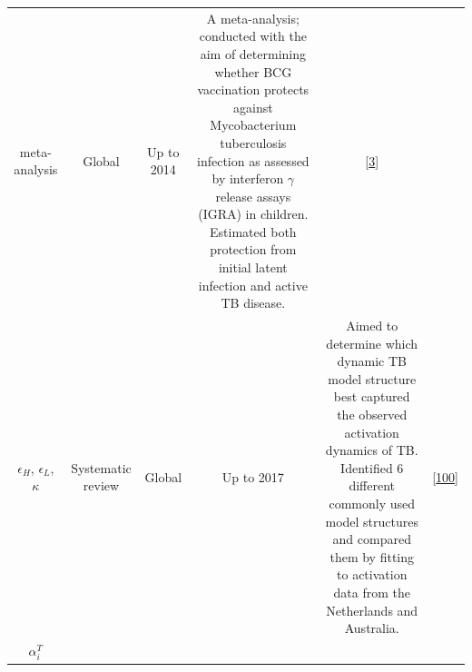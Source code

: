\documentclass[11pt,twoside]{bristolthesis}
\begin{document}
\begin{longtable}[]{@{}cccccc@{}}
\begin{minipage}[t]{0.10\columnwidth}
  meta-analysis\strut
  \end{minipage} & \begin{minipage}[t]{0.07\columnwidth}\centering
  Global\strut
  \end{minipage} & \begin{minipage}[t]{0.07\columnwidth}\centering
  Up to
  2014\strut
  \end{minipage} & \begin{minipage}[t]{0.27\columnwidth}\centering
  A meta-analysis; conducted with the aim
  of determining whether BCG vaccination
  protects against Mycobacterium
  tuberculosis infection as assessed by
  interferon \(\gamma\) release assays
  (IGRA) in children. Estimated both
  protection from initial latent infection
  and active TB disease.\strut
  \end{minipage} & \begin{minipage}[t]{0.11\columnwidth}\centering
  {[}\protect\hyperlink{ref-Roy2014}{3}{]}\strut
  \end{minipage}\tabularnewline
  \begin{minipage}[t]{0.21\columnwidth}\centering
  \(\epsilon_H\),
  \(\epsilon_L\),
  \(\kappa\)\strut
  \end{minipage} & \begin{minipage}[t]{0.10\columnwidth}\centering
  Systematic
  review\strut
  \end{minipage} & \begin{minipage}[t]{0.07\columnwidth}\centering
  Global\strut
  \end{minipage} & \begin{minipage}[t]{0.07\columnwidth}\centering
  Up to
  2017\strut
  \end{minipage} & \begin{minipage}[t]{0.27\columnwidth}\centering
  Aimed to determine which dynamic TB
  model structure best captured the
  observed activation dynamics of TB.
  Identified 6 different commonly used
  model structures and compared them by
  fitting to activation data from the
  Netherlands and Australia.\strut
  \end{minipage} & \begin{minipage}[t]{0.11\columnwidth}\centering
  {[}\protect\hyperlink{ref-Ragonnet2017}{100}{]}\strut
  \end{minipage}\tabularnewline
  \begin{minipage}[t]{0.21\columnwidth}\centering
  \(\alpha_i^T\)\strut
  \end{minipage} & \begin{minipage}[t]{0.10\columnwidth}\centering

\end{minipage}
\end{longtable}
\end{document}
